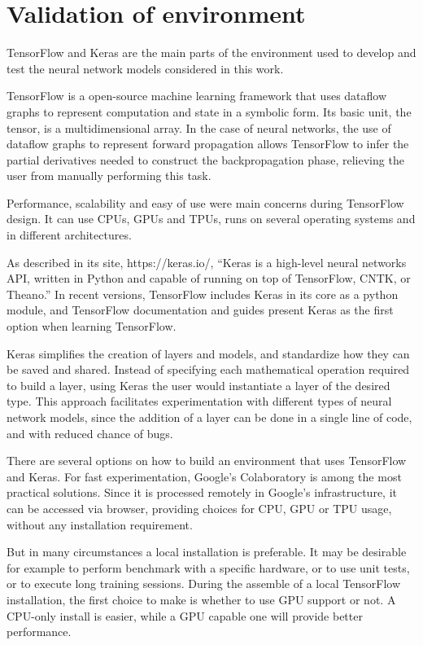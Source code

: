 \chapter{Validation of environment}
TensorFlow and Keras are the main parts of the environment used to develop and test the neural network models considered in this work.

TensorFlow \cite{abadi_tensorflow:_2016} is a open-source machine learning framework that uses dataflow graphs to represent computation and state in a symbolic form. Its basic unit, the tensor, is a multidimensional array. In the case of neural networks, the use of dataflow graphs to represent forward propagation allows TensorFlow to infer the partial derivatives needed to construct the backpropagation phase, relieving the user from manually performing this task.

Performance, scalability and easy of use were main concerns during TensorFlow design. It can use CPUs, GPUs and TPUs, runs on several operating systems and in different architectures.

As described in its site, https://keras.io/\cite{chollet_keras_2019}, ``Keras is a high-level neural networks API, written in Python and capable of running on top of TensorFlow, CNTK, or Theano.'' In recent versions, TensorFlow includes Keras in its core as a python module, and TensorFlow documentation and guides present Keras as the first option when learning TensorFlow.

Keras simplifies the creation of layers and models, and standardize how they can be saved and shared. Instead of specifying each mathematical operation required to build a layer, using Keras the user would instantiate a layer of the desired type. This approach facilitates experimentation with different types of neural network models, since the addition of a layer can be done in a single line of code, and with reduced chance of bugs.

There are several options on how to build an environment that uses TensorFlow and Keras. For fast experimentation, Google's Colaboratory\cite{carneiro_performance_2018} is among the most practical solutions. Since it is processed remotely in Google's infrastructure, it can be accessed via browser, providing choices for CPU, GPU or TPU usage, without any installation requirement.

But in many circumstances a local installation is preferable. It may be desirable for example to perform benchmark with a specific hardware, or to use unit tests, or to execute long training sessions. 
During the assemble of a local TensorFlow installation, the first choice to make is whether to use GPU support or not. A CPU-only install is easier, while a GPU capable one will provide better performance.

